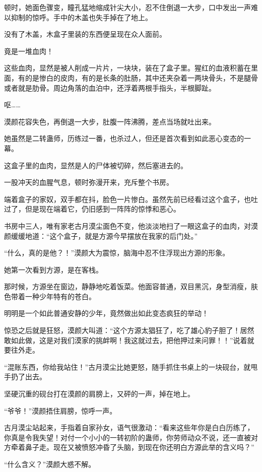 \begin{this_body}
顿时，她面色骤变，瞳孔猛地缩成针尖大小，忍不住倒退一大步，口中发出一声难以抑制的惊呼。手中的木盖也失手掉在了地上。

没有了木盖，木盒子里装的东西便呈现在众人面前。

竟是一堆血肉！

这些血肉，显然是被人削成一片片，一块块，装在了盒子里。猩红的血液积蓄在里面，有的是惨白的皮肉，有的是长条的肚肠，其中还夹杂着一两块骨头，不是腿骨或者就是肋骨。周边角落的血泊中，还浮着两根手指头，半根脚趾。

呕……

漠颜花容失色，再倒退一大步，肚腹一阵沸腾，差点当场就吐出来。

她虽然是二转蛊师，历练过一番，也杀过人，但还是首次看到如此恶心变态的一幕。

这盒子里的血肉，显然是人的尸体被切碎，然后塞进去的。

一股冲天的血腥气息，顿时弥漫开来，充斥整个书房。

端着盒子的家奴，双手都在抖，脸色一片惨白。虽然先前已经看过这个盒子，也吐过了，但是现在端着它，仍旧感到一阵阵的惊悸和恶心。

书房中三人，唯有家老古月漠尘面色不变，他淡淡地扫了一眼这盒子的血肉，对漠颜缓缓地道：“这个盒子，就是方源今早摆放在我家的后门处。”

“什么，真的是他？！”漠颜大为震惊，脑海中忍不住浮现出方源的形象。

她第一次看到方源，是在客栈。

那时候，方源坐在窗边，静静地吃着饭菜。他面容普通，双目黑沉，身型消瘦，肤色带着一种少年特有的苍白。

明明是一个如此普通安静的少年，竟然做出如此变态疯狂的举动！

惊恐之后就是狂怒，漠颜大叫道：“这个方源太猖狂了，吃了雄心豹子胆了！居然敢如此做，这是对我们漠家的挑衅啊！我这就过去，把他押过来问罪！！”说着就要往外走。

“混账东西，你给我站住！”古月漠尘比她更怒，随手抓住书桌上的一块砚台，就甩手扔了出去。

坚硬沉重的砚台打在漠颜的肩膀上，又砰的一声，掉在地上。

“爷爷！”漠颜捂住肩膀，惊呼一声。

古月漠尘站起来，手指着自家孙女，语气很激动：“看来这些年你是白白历练了，你真是令我失望！对付一个小小的一转初阶的蛊师，你劳师动众不说，还一直被对方牵着鼻子走。现在又被愤怒冲昏了头脑，到现在你还明白方源此举的含义吗？”

“什么含义？”漠颜大惑不解。


\end{this_body}
